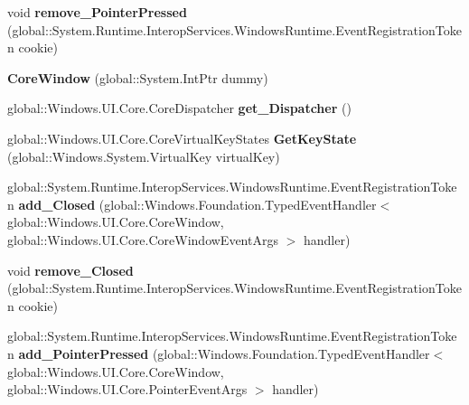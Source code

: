 \begin{DoxyCompactItemize}
void {\bfseries remove\+\_\+\+Pointer\+Pressed} (global\+::\+System.\+Runtime.\+Interop\+Services.\+Windows\+Runtime.\+Event\+Registration\+Token cookie)
\item 
\mbox{\label{class_windows_1_1_u_i_1_1_core_1_1_core_window_a482951fd8b0eed511b43c092a3931985}} 
{\bfseries Core\+Window} (global\+::\+System.\+Int\+Ptr dummy)
\item 
\mbox{\label{class_windows_1_1_u_i_1_1_core_1_1_core_window_a4782a27adee4d380d23689281fc88557}} 
global\+::\+Windows.\+U\+I.\+Core.\+Core\+Dispatcher {\bfseries get\+\_\+\+Dispatcher} ()
\item 
\mbox{\label{class_windows_1_1_u_i_1_1_core_1_1_core_window_ade3fe1967e403778223e3236e0c503f3}} 
global\+::\+Windows.\+U\+I.\+Core.\+Core\+Virtual\+Key\+States {\bfseries Get\+Key\+State} (global\+::\+Windows.\+System.\+Virtual\+Key virtual\+Key)
\item 
\mbox{\label{class_windows_1_1_u_i_1_1_core_1_1_core_window_a961d684ac08b8daaba0ae932995c1a06}} 
global\+::\+System.\+Runtime.\+Interop\+Services.\+Windows\+Runtime.\+Event\+Registration\+Token {\bfseries add\+\_\+\+Closed} (global\+::\+Windows.\+Foundation.\+Typed\+Event\+Handler$<$ global\+::\+Windows.\+U\+I.\+Core.\+Core\+Window, global\+::\+Windows.\+U\+I.\+Core.\+Core\+Window\+Event\+Args $>$ handler)
\item 
\mbox{\label{class_windows_1_1_u_i_1_1_core_1_1_core_window_aa0cf80ef7200e08c7924a163be3833cf}} 
void {\bfseries remove\+\_\+\+Closed} (global\+::\+System.\+Runtime.\+Interop\+Services.\+Windows\+Runtime.\+Event\+Registration\+Token cookie)
\item 
\mbox{\label{class_windows_1_1_u_i_1_1_core_1_1_core_window_a40ea0111f6284c33ba8550a4473ce2cd}} 
global\+::\+System.\+Runtime.\+Interop\+Services.\+Windows\+Runtime.\+Event\+Registration\+Token {\bfseries add\+\_\+\+Pointer\+Pressed} (global\+::\+Windows.\+Foundation.\+Typed\+Event\+Handler$<$ global\+::\+Windows.\+U\+I.\+Core.\+Core\+Window, global\+::\+Windows.\+U\+I.\+Core.\+Pointer\+Event\+Args $>$ handler)

\end{DoxyCompactItemize}
